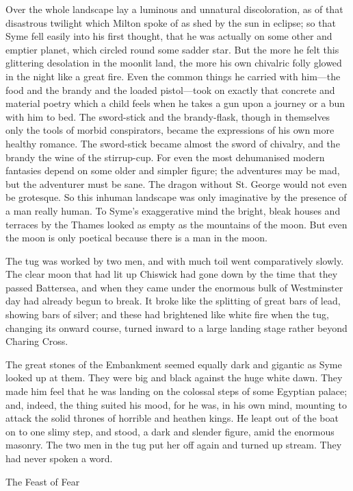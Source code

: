 Over the whole landscape lay a luminous and unnatural discoloration, as of that disastrous twilight which Milton spoke of as shed by the sun in eclipse; so that Syme fell easily into his first thought, that he was actually on some other and emptier planet, which circled round some sadder star. But the more he felt this glittering desolation in the moonlit land, the more his own chivalric folly glowed in the night like a great fire. Even the common things he carried with him⁠—the food and the brandy and the loaded pistol⁠—took on exactly that concrete and material poetry which a child feels when he takes a gun upon a journey or a bun with him to bed. The sword-stick and the brandy-flask, though in themselves only the tools of morbid conspirators, became the expressions of his own more healthy romance. The sword-stick became almost the sword of chivalry, and the brandy the wine of the stirrup-cup. For even the most dehumanised modern fantasies depend on some older and simpler figure; the adventures may be mad, but the adventurer must be sane. The dragon without St. George would not even be grotesque. So this inhuman landscape was only imaginative by the presence of a man really human. To Syme’s exaggerative mind the bright, bleak houses and terraces by the Thames looked as empty as the mountains of the moon. But even the moon is only poetical because there is a man in the moon.

The tug was worked by two men, and with much toil went comparatively slowly. The clear moon that had lit up Chiswick had gone down by the time that they passed Battersea, and when they came under the enormous bulk of Westminster day had already begun to break. It broke like the splitting of great bars of lead, showing bars of silver; and these had brightened like white fire when the tug, changing its onward course, turned inward to a large landing stage rather beyond Charing Cross.

The great stones of the Embankment seemed equally dark and gigantic as Syme looked up at them. They were big and black against the huge white dawn. They made him feel that he was landing on the colossal steps of some Egyptian palace; and, indeed, the thing suited his mood, for he was, in his own mind, mounting to attack the solid thrones of horrible and heathen kings. He leapt out of the boat on to one slimy step, and stood, a dark and slender figure, amid the enormous masonry. The two men in the tug put her off again and turned up stream. They had never spoken a word.

\chap[feastof] The Feast of Fear

